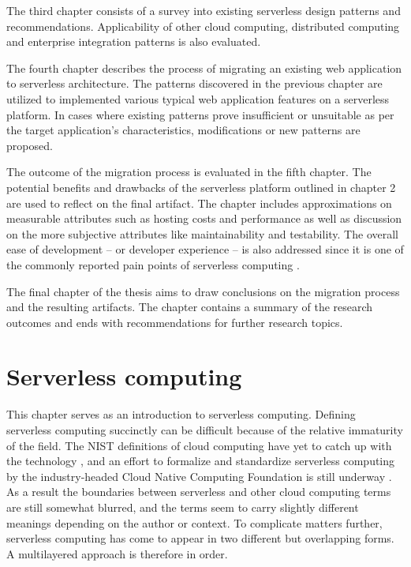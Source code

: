 \documentclass[utf8,english]{gradu3}
\begin{document}
The third chapter consists of a survey into existing serverless design patterns and recommendations. Applicability of other cloud computing, distributed computing and enterprise integration patterns is also evaluated.

The fourth chapter describes the process of migrating an existing web application to serverless architecture. The patterns discovered in the previous chapter are utilized to implemented various typical web application features on a serverless platform. In cases where existing patterns prove insufficient or unsuitable as per the target application's characteristics, modifications or new patterns are proposed.

The outcome of the migration process is evaluated in the fifth chapter. The potential benefits and drawbacks of the serverless platform outlined in chapter 2 are used to reflect on the final artifact. The chapter includes approximations on measurable attributes such as hosting costs and performance as well as discussion on the more subjective attributes like maintainability and testability. The overall ease of development -- or developer experience -- is also addressed since it is one of the commonly reported pain points of serverless computing \parencite{van2017spec}.

The final chapter of the thesis aims to draw conclusions on the migration process and the resulting artifacts. The chapter contains a summary of the research outcomes and ends with recommendations for further research topics.


\chapter{Serverless computing}

This chapter serves as an introduction to serverless computing. Defining serverless computing succinctly can be difficult because of the relative immaturity of the field. The NIST definitions of cloud computing have yet to catch up with the technology \parencite{nist11definitions}, and an effort to formalize and standardize serverless computing by the industry-headed Cloud Native Computing Foundation is still underway \parencite{cncf18serverlessWG}. As a result the boundaries between serverless and other cloud computing terms are still somewhat blurred, and the terms seem to carry slightly different meanings depending on the author or context. To complicate matters further, serverless computing has come to appear in two different but overlapping forms. A multilayered approach is therefore in order.
\end{document}
